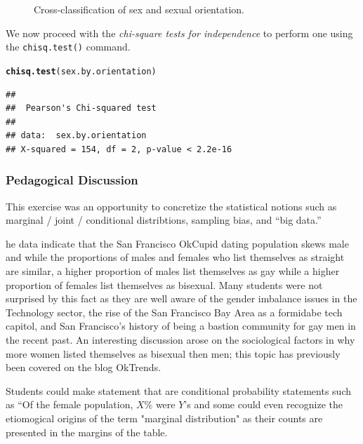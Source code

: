 \documentclass{article}\usepackage[]{graphicx}\usepackage[]{color}
\makeatletter
\newcommand{\hlstd}[1]{\textcolor[rgb]{0.345,0.345,0.345}{#1}}%
\newcommand{\hlkwd}[1]{\textcolor[rgb]{0.737,0.353,0.396}{\textbf{#1}}}%
\newenvironment{kframe}{%
 \def\at@end@of@kframe{}%
 \ifinner\ifhmode%
  \def\at@end@of@kframe{\end{minipage}}%
  \begin{minipage}{\columnwidth}%
 \fi\fi%
 \def\FrameCommand##1{\hskip\@totalleftmargin \hskip-\fboxsep
 \colorbox{shadecolor}{##1}\hskip-\fboxsep
     \hskip-\linewidth \hskip-\@totalleftmargin \hskip\columnwidth}%
 \MakeFramed {\advance\hsize-\width
   \@totalleftmargin\z@ \linewidth\hsize
   \@setminipage}}%
 {\par\unskip\endMakeFramed%
 \at@end@of@kframe}
\newenvironment{knitrout}{}{} %
\makeatother
\begin{document}
\begin{knitrout}
\begin{figure}
{}

\caption[Cross-classification of sex and sexual orientation]{Cross-classification of sex and sexual orientation.}\label{fig:sex_by_orientation}
\end{figure}


\end{knitrout}

We now proceed with the \textit{chi-square tests for independence} to perform one using the \verb#chisq.test()# command.
\begin{knitrout}
\color{fgcolor}\begin{kframe}
\begin{alltt}
\hlkwd{chisq.test}\hlstd{(sex.by.orientation)}
\end{alltt}
\begin{verbatim}
## 
## 	Pearson's Chi-squared test
## 
## data:  sex.by.orientation
## X-squared = 154, df = 2, p-value < 2.2e-16
\end{verbatim}
\end{kframe}
\end{knitrout}



\subsubsection{Pedagogical Discussion}
This exercise was an opportunity to concretize the statistical notions such as marginal / joint / conditional distribtions, sampling bias, and ``big data.''

he data indicate that the San Francisco OkCupid dating population skews male and while the proportions of males and females who list themselves as straight are similar, a higher proportion of males list themselves as gay while a higher proportion of females list themselves as bisexual.  Many students were not surprised by this fact as they are well aware of the gender imbalance issues in the Technology sector, the rise of the San Francisco Bay Area as a formidabe tech capitol, and San Francisco's history of being a bastion community for gay men in the recent past.  An interesting discussion arose on the sociological factors in why more women listed themselves as bisexual then men; this topic has previously been covered on the blog OkTrends\cite{OkTrendsLies}.

Students could make statement that are conditional probability statements such as ``Of the female population, $X$\% were $Y$'s and some could even recognize the etiomogical origins of the term "marginal distribution" as their counts are presented in the margins of the table.  
\end{document}
